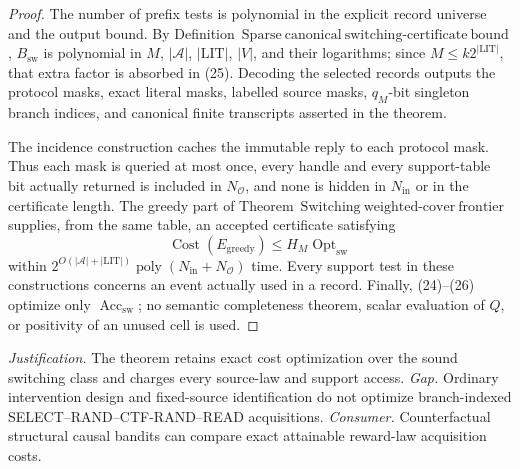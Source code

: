 \documentclass{article}
\begin{document}
\begin{proof}
The number of prefix tests is polynomial in the explicit record universe and the output bound.  By Definition~\(\mathrm{Sparse\ canonical\ switching\mbox{-}certificate\ bound}\), \(B_{\mathrm{sw}}\) is polynomial in \(M\), \(|\mathcal A|\), \(|\mathrm{LIT}|\), \(|V|\), and their logarithms; since \(M\leq k2^{|\mathrm{LIT}|}\), that extra factor is absorbed in (25).  Decoding the selected records outputs the protocol masks, exact literal masks, labelled source masks, \(q_M\)-bit singleton branch indices, and canonical finite transcripts asserted in the theorem.

The incidence construction caches the immutable reply to each protocol mask.  Thus each mask is queried at most once, every handle and every support-table bit actually returned is included in \(N_{\mathcal O}\), and none is hidden in \(N_{\mathrm{in}}\) or in the certificate length.  The greedy part of Theorem~\(\mathrm{Switching\ weighted\mbox{-}cover\ frontier}\) supplies, from the same table, an accepted certificate satisfying
\[
 \operatorname{Cost}(E_{\mathrm{greedy}})
 \leq H_M\operatorname{Opt}_{\mathrm{sw}}
 \tag{26}
\]
within \(2^{O(|\mathcal A|+|\mathrm{LIT}|)}\operatorname{poly}(N_{\mathrm{in}}+N_{\mathcal O})\) time.  Every support test in these constructions concerns an event actually used in a record.  Finally, (24)--(26) optimize only \(\operatorname{Acc}_{\mathrm{sw}}\); no semantic completeness theorem, scalar evaluation of \(Q\), or positivity of an unused cell is used.
\end{proof}
\par\smallskip\noindent \textit{Justification.} The theorem retains exact cost optimization over the sound switching class and charges every source-law and support access. \textit{Gap.} Ordinary intervention design and fixed-source identification do not optimize branch-indexed SELECT--RAND--CTF-RAND--READ acquisitions. \textit{Consumer.} Counterfactual structural causal bandits can compare exact attainable reward-law acquisition costs.
\end{document}
